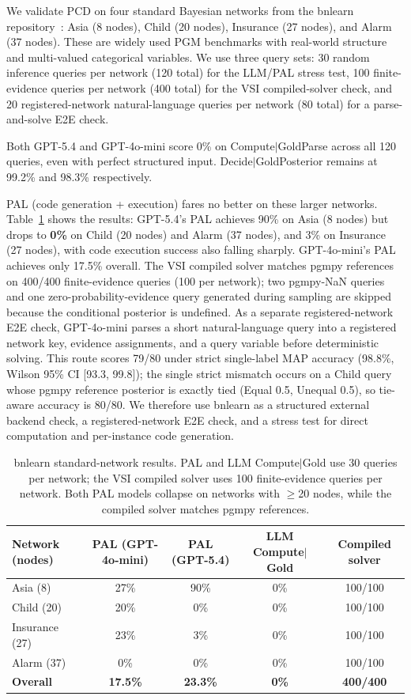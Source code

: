 \documentclass{article}
\begin{document}
We validate PCD on four standard Bayesian networks from the bnlearn repository~\citep{scutari2010bnlearn}: Asia (8 nodes), Child (20 nodes), Insurance (27 nodes), and Alarm (37 nodes).
These are widely used PGM benchmarks with real-world structure and multi-valued categorical variables.
We use three query sets: 30 random inference queries per network (120 total) for the LLM/PAL stress test, 100 finite-evidence queries per network (400 total) for the VSI compiled-solver check, and 20 registered-network natural-language queries per network (80 total) for a parse-and-solve E2E check.

Both GPT-5.4 and GPT-4o-mini score 0\% on Compute$\mid$GoldParse across all 120 queries, even with perfect structured input. Decide$\mid$GoldPosterior remains at 99.2\% and 98.3\% respectively.

PAL (code generation + execution) fares no better on these larger networks.
Table~\ref{tab:bnlearn_pal} shows the results: GPT-5.4's PAL achieves 90\% on Asia (8 nodes) but drops to \textbf{0\%} on Child (20 nodes) and Alarm (37 nodes), and 3\% on Insurance (27 nodes), with code execution success also falling sharply.
GPT-4o-mini's PAL achieves only 17.5\% overall.
The VSI compiled solver matches pgmpy references on 400/400 finite-evidence queries (100 per network); two pgmpy-NaN queries and one zero-probability-evidence query generated during sampling are skipped because the conditional posterior is undefined.
As a separate registered-network E2E check, GPT-4o-mini parses a short natural-language query into a registered network key, evidence assignments, and a query variable before deterministic solving.
This route scores 79/80 under strict single-label MAP accuracy (98.8\%, Wilson 95\% CI [93.3, 99.8]); the single strict mismatch occurs on a Child query whose pgmpy reference posterior is exactly tied (Equal 0.5, Unequal 0.5), so tie-aware accuracy is 80/80.
We therefore use bnlearn as a structured external backend check, a registered-network E2E check, and a stress test for direct computation and per-instance code generation.

\begin{table}[ht]
\centering
\small
\caption{bnlearn standard-network results. PAL and LLM Compute$\mid$Gold use 30 queries per network; the VSI compiled solver uses 100 finite-evidence queries per network. Both PAL models collapse on networks with $\geq$20 nodes, while the compiled solver matches pgmpy references.}
\label{tab:bnlearn_pal}
\begin{tabular}{@{}lcccc@{}}
\toprule
Network (nodes) & PAL (GPT-4o-mini) & PAL (GPT-5.4) & LLM Compute$\mid$Gold & Compiled solver \\
\midrule
Asia (8) & 27\% & 90\% & 0\% & 100/100 \\
Child (20) & 20\% & 0\% & 0\% & 100/100 \\
Insurance (27) & 23\% & 3\% & 0\% & 100/100 \\
Alarm (37) & 0\% & 0\% & 0\% & 100/100 \\
\midrule
\textbf{Overall} & \textbf{17.5\%} & \textbf{23.3\%} & \textbf{0\%} & \textbf{400/400} \\
\bottomrule
\end{tabular}
\end{table}
\end{document}

